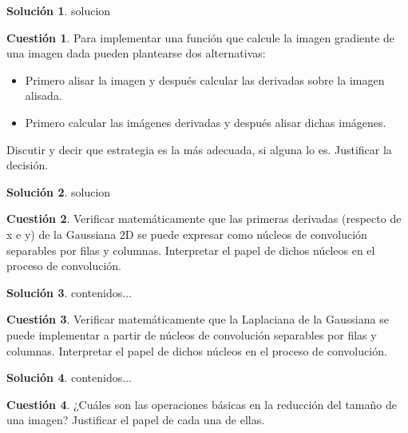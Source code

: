 \documentclass[a4paper, 11pt]{article}
\theoremstyle{definition}
\newtheorem{cuestion}{Cuestión}
\newtheorem*{solucion}{Solución}
\begin{document}
  \begin{solucion}
      solucion
  \end{solucion}

  \begin{cuestion}
      Para implementar una función que calcule la imagen gradiente de una
      imagen dada pueden plantearse dos alternativas:
      \begin{itemize}
      	\item Primero alisar la imagen y después calcular las derivadas sobre la imagen alisada.
      	\item Primero calcular las imágenes derivadas y después alisar dichas imágenes.
      \end{itemize}
      Discutir y decir que estrategia es la más adecuada, si alguna lo es. Justificar la decisión.

  \end{cuestion}

  \begin{solucion}
      solucion
  \end{solucion}

  \begin{cuestion}
  	Verificar matemáticamente que las primeras derivadas (respecto de x
  	e y) de la Gaussiana 2D se puede expresar como núcleos de convolución
  	separables por filas y columnas. Interpretar el papel de dichos núcleos
  	en el proceso de convolución.
  \end{cuestion}

  \begin{solucion}
  	contenidos...
  \end{solucion}

  \begin{cuestion}
     	Verificar matemáticamente que la Laplaciana de la Gaussiana se puede implementar a partir de núcleos de convolución separables por filas y columnas. Interpretar el papel de dichos núcleos en el proceso de convolución.

  \end{cuestion}

  \begin{solucion}
     	contenidos...
  \end{solucion}


  \begin{cuestion}
     	 ¿Cuáles son las operaciones básicas en la reducción del tamaño de una imagen? Justificar el papel de cada una de ellas.

  \end{cuestion}
\end{document}

